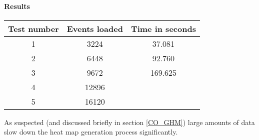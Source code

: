 \paragraph{Results}
\begin{center}
\begin{tabular}{| c | c | c |}
\hline
Test number & Events loaded & Time in seconds \\ 
\hline
1 & 3224 & 37.081 \\ 
\hline
2 & 6448 & 92.760 \\ 
\hline
3 & 9672 & 169.625 \\
\hline
4 & 12896 &  \\
\hline
5 & 16120 &  \\
\hline
\end{tabular}
\end{center}
As suspected (and discussed briefly in section \ref{CO_GHM}) large amounts of data slow down the heat map generation process significantly. 
